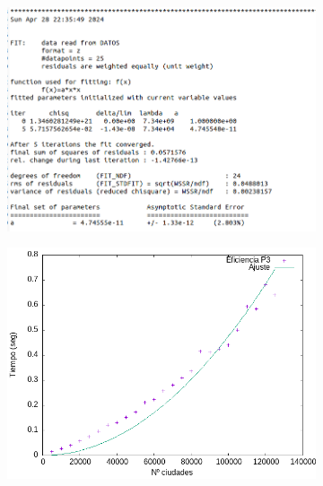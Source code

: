 \documentclass{article}
\begin{document}
\begin{figure}[H]
    \begin{subfigure}{0.5\textwidth}
        \centering
        \includegraphics[width=\textwidth]{Problema3/imagenes/log-cuadratico.png}
    \end{subfigure} \hfill
    \begin{subfigure}{0.5\textwidth}
        \centering
        \includegraphics[width=\textwidth]{Problema3/imagenes/regresionP3.png}
    \end{subfigure}
\end{figure}
\end{document}
